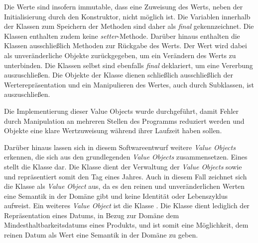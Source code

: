 Die Werte sind insofern immutable, dass eine Zuweisung des Werts, neben der Initialisierung durch den Konstruktor, nicht möglich ist.
Die Variablen innerhalb der Klassen zum Speichern der Methoden sind daher als \textit{final} gekennzeichnet.
Die Klassen enthalten zudem keine \textit{setter}-Methode.
Darüber hinaus enthalten die Klassen ausschließlich Methoden zur Rückgabe des Werts.
Der Wert wird dabei als unveränderliche Objekte zurückgegeben, um ein Verändern des Werts zu unterbinden.
Die Klassen selbst sind ebenfalls \textit{final} deklariert, um eine Vererbung auszuschließen.
Die Objekte der Klasse dienen schließlich ausschließlich der Werterepräsentation und ein Manipulieren des Wertes, auch durch Subklassen, ist auszuschließen.

Die Implementierung dieser Value Objects wurde durchgeführt, damit Fehler durch Manipulation an mehreren Stellen des Programms reduziert werden und Objekte eine klare Wertzuweisung während ihrer Laufzeit haben sollen.

Darüber hinaus lassen sich in diesem Softwareentwurf weitere \textit{Value Objects} erkennen, die sich aus den grundlegenden \textit{Value Objects} zusammensetzen.
Eines stellt die Klasse \href{}{} dar.
Die Klasse dient der Verwaltung der \textit{Value Objects} \href{https://github.com/lucasmerkel/dhbw-advancedswe-programmentwurf/blob/5764d7da4cfd0562ed8e96128e92f85c30b7309d/swe_programmentwurf/consumergoods-inventory-planner/4-cip-abstractioncode/src/main/java/de/dhbw/cip/abstractioncode/Day.java}{} sowie \href{https://github.com/lucasmerkel/dhbw-advancedswe-programmentwurf/blob/5764d7da4cfd0562ed8e96128e92f85c30b7309d/swe_programmentwurf/consumergoods-inventory-planner/4-cip-abstractioncode/src/main/java/de/dhbw/cip/abstractioncode/Month.java}{} und repräsentiert somit den Tag eines Jahres.
Auch in diesem Fall zeichnet sich die Klasse \href{}{} als \textit{Value Object} aus, da es den reinen und unveränderlichen Werten eine Semantik in der Domäne gibt und keine Identität oder Lebenszyklus aufweist.
Ein weiteres \textit{Value Object} ist die Klasse \href{https://github.com/lucasmerkel/dhbw-advancedswe-programmentwurf/blob/5764d7da4cfd0562ed8e96128e92f85c30b7309d/swe_programmentwurf/consumergoods-inventory-planner/3-cip-domain/src/main/java/de/dhbw/cip/domain/BestBeforeDate.java}{}.
Die Klasse dient lediglich der Repräsentation eines Datums, in Bezug zur Domäne dem Mindesthaltbarkeitsdatums eines Produkts, und ist somit eine Möglichkeit, dem reinen Datum als Wert eine Semantik in der Domäne zu geben.

